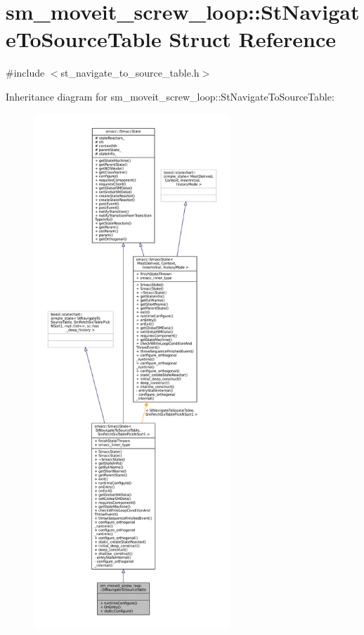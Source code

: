 \hypertarget{structsm__moveit__screw__loop_1_1StNavigateToSourceTable}{}\section{sm\+\_\+moveit\+\_\+screw\+\_\+loop\+:\+:St\+Navigate\+To\+Source\+Table Struct Reference}
\label{structsm__moveit__screw__loop_1_1StNavigateToSourceTable}


{\ttfamily \#include $<$st\+\_\+navigate\+\_\+to\+\_\+source\+\_\+table.\+h$>$}



Inheritance diagram for sm\+\_\+moveit\+\_\+screw\+\_\+loop\+:\+:St\+Navigate\+To\+Source\+Table\+:
\nopagebreak
\begin{figure}[H]
\begin{center}
\leavevmode
\includegraphics[height=550pt]{structsm__moveit__screw__loop_1_1StNavigateToSourceTable__inherit__graph}
\end{center}
\end{figure}


